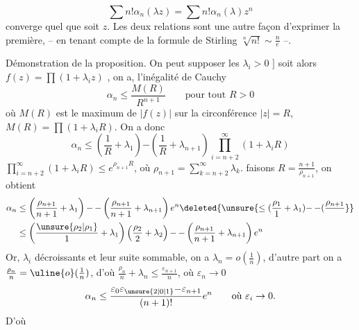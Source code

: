 \[ \sum n!\alpha_n(\lambda z)=\sum n!\alpha_n(\lambda)z^n \]
converge
quel que soit $z$. Les deux  relations
 sont une autre façon d'exprimer la première,
-- en tenant compte de la formule de
Stirling $\sqrt[n]{n!}\sim\frac{n}{e}$ --.

Démonstration de la proposition. On peut
supposer les $\lambda_i>0$  $]$ soit alors $f(z)=\prod(1+\lambda_i z)$
,   on a,  l'inégalité
de Cauchy
\[ \alpha_n\leq\frac{M(R)}{R^{n+1}}\qquad\text{pour tout }R>0 \]
où $M(R)$ est le maximum de $|f(z)|$ sur la
circonférence $|z|=R$,  $M(R)=\prod(1+\lambda_iR)$.
 On a donc
\[ \alpha_n\leq\left(\frac1R+\lambda_1\right)\mathord{-}\left(\frac1R+\lambda_{n+1}\right)\prod_{i=n+2}^{\infty}(1+\lambda_i R) \]
  $\prod_{i=n+2}^{\infty}(1+\lambda_i R)\leq e^{\rho_{n+1}R}$, où
$\rho_{n+1}=\sum_{k=n+2}^{\infty}\lambda_k$. faisons $R=\frac{n+1}{\rho_{n+1}}$, on obtient
\[ \begin{aligned}
\alpha_n&\leq\left(\frac{\rho_{n+1}}{n+1}+\lambda_1\right)\mathord{-}\,\mathord{-}\left(\frac{\rho_{n+1}}{n+1}+\lambda_{n+1}\right)e^n \deleted{\unsure{\leq(\frac{\rho_1}{1}+\lambda_1)\mathord{-}\,\mathord{-}(\frac{\rho_{n+1}}{}}}\\
&\leq\left(\frac{\unsure{\rho_2|\rho_1}}{1}+\lambda_1\right)\left(\frac{\rho_2}{2}+\lambda_2\right)\mathord{-}\,\mathord{-}\left(\frac{\rho_{n+1}}{n+1}+\lambda_{n+1}\right)e^n
\end{aligned} \]
Or,   $\lambda_i$   décroissants et leur
suite sommable, on a $\lambda_n=o(\frac1n)$, d'autre part on
a  $\frac{\rho_n}{n}=\uline{o}(\frac{1}{n})$, d'où $\frac{\rho_n}{n}+\lambda_n\leq\frac{\varepsilon_{n+1}}{n}$, où $\varepsilon_n\to0$
\[ \alpha_n\leq\frac{\varepsilon_0\varepsilon_{\unsure{2|0|1}}\mathord{-}\varepsilon_{n+1}}{(n+1)!}e^n\qquad\text{où }\varepsilon_i\to0. \]
D'où
